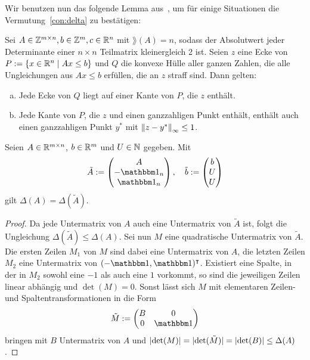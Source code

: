 Wir benutzen nun das folgende Lemma aus~\cite[Theorem 2 und Beweis]{VESELOV2009220}, um für einige Situationen die Vermutung~\ref{con:delta} zu bestätigen:
\begin{lemma}\label{lem:veselov}
	Sei $A\in\mathbb{Z}^{m\times n},b\in\mathbb{Z}^m,c\in\mathbb{R}^n$ mit $\rang(A)=n$, sodass der Absolutwert jeder Determinante einer $n\times n$ Teilmatrix kleinergleich 2 ist.
	Seien $z$ eine Ecke von $P:=\{x\in\mathbb{R}^n\mid Ax\leq b \}$ und $Q$ die konvexe Hülle aller ganzen Zahlen, die alle Ungleichungen aus $Ax\leq b$ erfüllen, die an $z$ straff sind.
	Dann gelten:
	\begin{enumerate}[(a)]
		\item Jede Ecke von $Q$ liegt auf einer Kante von $P$, die $z$ enthält.
		\item Jede Kante von $P$, die $z$ und einen ganzzahligen Punkt enthält, enthält auch einen ganzzahligen Punkt $y^*$ mit $\left\lVert z -y^*\right\rVert_\infty\leq 1$.
	\end{enumerate}
\end{lemma}
\begin{lemma}\label{lem:bounded}
	Seien $A\in\mathbb{R}^{m\times n}$, $b\in\mathbb{R}^m$ und $U\in\mathbb{N}$ gegeben.
	Mit $$
		\tilde{A}:=
		\begin{pmatrix} A \\ -\one_n \\ \one_n \end{pmatrix},\quad
		\tilde{b}:=\begin{pmatrix} b \\ U \\ U \end{pmatrix}
	$$
	gilt $\Delta(A)=\Delta(\tilde{A})$.
\end{lemma}
\begin{proof}
	Da jede Untermatrix von $A$ auch eine Untermatrix von $\tilde{A}$ ist, folgt die Ungleichung $\Delta(\tilde{A})\leq\Delta(A)$.
	Sei nun $M$ eine quadratische Untermatrix von $\tilde{A}$.
	Die ersten Zeilen $M_1$ von $M$ sind dabei eine Untermatrix von $A$, die letzten Zeilen $M_2$ eine Untermatrix von $(-\one, \one)\transpose$.
	Existiert eine Spalte, in der in $M_2$ sowohl eine $-1$ als auch eine $1$ vorkommt, so sind die jeweiligen Zeilen linear abhängig und $\det(M)=0$.
	Sonst lässt sich $M$ mit elementaren Zeilen- und Spaltentransformationen in die Form $$\tilde{M}:= \begin{pmatrix}
		B & 0 \\
		0 & \one
	\end{pmatrix}$$ bringen mit $B$ Untermatrix von $A$ und $\lvert \det(M) \rvert=\lvert \det(\tilde{M}) \rvert=\lvert \det(B) \rvert\leq\Delta(A)$.
\end{proof}

